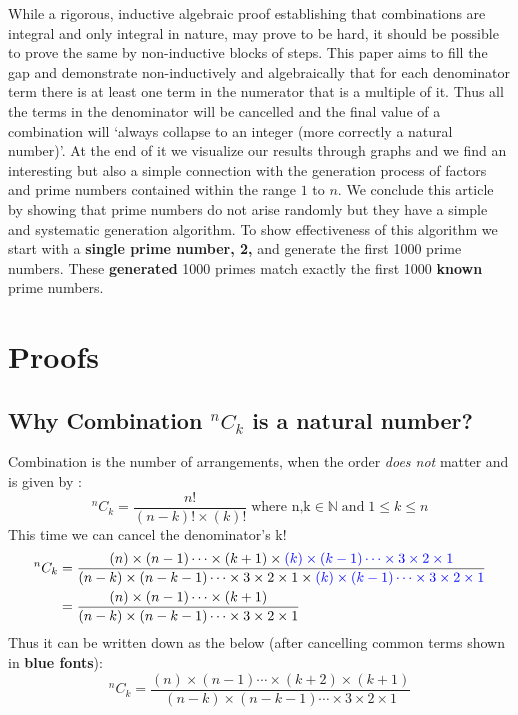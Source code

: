 \documentclass[10pt, twoside]{article}
\newcommand*{\Combination}[2]{{}^{#1}C_{#2}}%
\begin{document}
	While a rigorous, inductive algebraic proof establishing that combinations are integral and only integral in nature, may prove to be hard, it should be possible to prove the same by non-inductive blocks of steps. This paper aims to fill the gap and demonstrate non-inductively and algebraically that for each denominator term there is at least one term in the numerator that is a multiple of it. Thus all the terms in the denominator will be cancelled and the final value of a combination will `always collapse to an integer (more correctly a natural number)'. At the end of it we visualize our results through graphs and we find an interesting but also a simple connection with the generation process of factors and prime numbers contained within the range $1$ to $n$. We conclude this article by showing that prime numbers do not arise randomly but they have a simple and systematic generation algorithm. To show effectiveness of this algorithm we start with a \textbf{single prime number, 2,} and generate the first 1000 prime numbers. These \textbf{generated} 1000 primes match exactly the first 1000 \textbf{known} prime numbers.
	\section{Proofs}
 	\subsection{Why Combination $\Combination{n}{k}$ is a natural number?}
 	Combination is the number of arrangements, when the order \textit{does not} matter and is given by \cite{PrincTechCombinatorics}:\newline
 	\begin{equation}
 		\Combination{n}{k} = \frac{n!}{(n-k)!\times(k)!} \; \text{where n,k} \in \mathbb{N} \; \text{and} \; 1 \leq k \leq n
 	\end{equation}
 	This time we can cancel the denominator's k!
 	\begin{align*}
 		\Combination{n}{k} &= \frac{(n)\times(n-1)\cdots\times(k+1)\times\color{blue}(k)\times(k-1)\cdots\times3\times2\times1}{(n-k)\times(n-k-1)\cdots\times3\times2\times1\times\color{blue}(k)\times(k-1)\cdots\times3\times2\times1}\\
 		&= \frac{(n)\times(n-1)\cdots\times(k+1)}{(n-k)\times(n-k-1)\cdots\times3\times2\times1}
 	\end{align*}
 Thus it can be written down as the below (after cancelling common terms shown in \textbf{\color{blue}blue fonts}):
 \begin{equation}
 	\Combination{n}{k} = \frac{(n)\times(n-1)\cdots\times(k+2)\times(k+1)}{(n-k)\times(n-k-1)\cdots\times3\times2\times1} \label{reducedCombinationForm}
 \end{equation}
\end{document}
